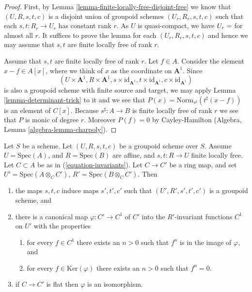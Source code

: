\begin{proof}
First, by Lemma \ref{lemma-finite-locally-free-disjoint-free}
we know that $(U, R, s, t, c)$ is a disjoint union
of groupoid schemes $(U_r, R_r, s, t, c)$ such that each $s, t : R_r \to U_r$
has constant rank $r$. As $U$ is quasi-compact, we have $U_r = \empty$ for
almost all $r$. It suffices to prove the lemma for each $(U_r, R_r, s, t, c)$
and hence we may assume that $s, t$ are finite locally free of rank $r$.

\medskip\noindent
Assume that $s,t$ are finite locally free of rank $r$.
Let $f \in A$. Consider the element $x - f \in A[x]$, where we think
of $x$ as the coordinate on $\mathbf{A}^1$.
Since
$$
(U \times \mathbf{A}^1, R \times \mathbf{A}^1,
s \times \text{id}_{\mathbf{A}^1},
t \times \text{id}_{\mathbf{A}^1},
c \times \text{id}_{\mathbf{A}^1})
$$
is also a groupoid scheme with finite source and target, we may apply
Lemma \ref{lemma-determinant-trick} to it and we see that
$P(x) = \text{Norm}_{s^\sharp}(t^\sharp(x - f))$
is an element of $C[x]$. Because $s^\sharp : A \to B$ is finite locally
free of rank $r$ we see that $P$ is monic of degree $r$.
Moreover $P(f) = 0$ by Cayley-Hamilton
(Algebra, Lemma \ref{algebra-lemma-charpoly}).
\end{proof}

\begin{lemma}
\label{lemma-invariants-base-change}
Let $S$ be a scheme. Let $(U, R, s, t, c)$ be a groupoid scheme over $S$.
Assume $U = \text{Spec}(A)$, and $R = \text{Spec}(B)$ are affine, and
$s, t : R \to U$ finite locally free. Let $C \subset A$ be as in
(\ref{equation-invariants}). Let $C \to C'$ be a ring map, and set
$U' = \text{Spec}(A \otimes_C C')$,
$R' = \text{Spec}(B \otimes_C C')$.
Then
\begin{enumerate}
\item the maps $s,t,c$ induce maps $s', t', c'$ such that
$(U', R', s', t', c')$ is a groupoid scheme, and
\item there is a canonical map $\varphi : C' \to C^1$ of $C'$ into
the $R'$-invariant functions $C^1$ on $U'$ with the properties
\begin{enumerate}
\item for every $f \in C^1$ there exists an $n > 0$ such that
$f^n$ is in the image of $\varphi$, and
\item for every $f \in \text{Ker}(\varphi)$ there exists
an $n > 0$ such that $f^n = 0$.
\end{enumerate}
\item if $C \to C'$ is flat then $\varphi$ is an isomorphism.
\end{enumerate}
\end{lemma}

